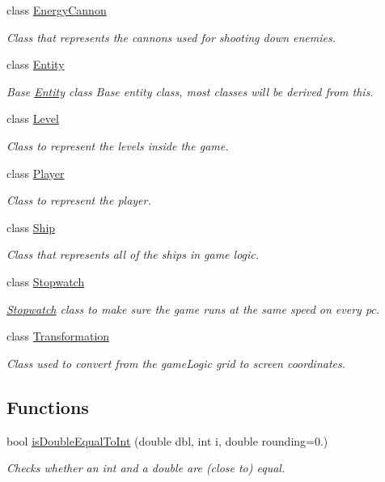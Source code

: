\begin{DoxyCompactItemize}
class \hyperlink{classGameLogic_1_1EnergyCannon}{Energy\+Cannon}
\begin{DoxyCompactList}\small\item\em Class that represents the cannons used for shooting down enemies. \end{DoxyCompactList}\item 
class \hyperlink{classGameLogic_1_1Entity}{Entity}
\begin{DoxyCompactList}\small\item\em Base \hyperlink{classGameLogic_1_1Entity}{Entity} class Base entity class, most classes will be derived from this. \end{DoxyCompactList}\item 
class \hyperlink{classGameLogic_1_1Level}{Level}
\begin{DoxyCompactList}\small\item\em Class to represent the levels inside the game. \end{DoxyCompactList}\item 
class \hyperlink{classGameLogic_1_1Player}{Player}
\begin{DoxyCompactList}\small\item\em Class to represent the player. \end{DoxyCompactList}\item 
class \hyperlink{classGameLogic_1_1Ship}{Ship}
\begin{DoxyCompactList}\small\item\em Class that represents all of the ships in game logic. \end{DoxyCompactList}\item 
class \hyperlink{classGameLogic_1_1Stopwatch}{Stopwatch}
\begin{DoxyCompactList}\small\item\em \hyperlink{classGameLogic_1_1Stopwatch}{Stopwatch} class to make sure the game runs at the same speed on every pc. \end{DoxyCompactList}\item 
class \hyperlink{classGameLogic_1_1Transformation}{Transformation}
\begin{DoxyCompactList}\small\item\em Class used to convert from the game\+Logic grid to screen coordinates. \end{DoxyCompactList}\end{DoxyCompactItemize}
\subsection*{Functions}
\begin{DoxyCompactItemize}
\item 
bool \hyperlink{namespaceGameLogic_a788b107597480e46241295de1c44670a}{is\+Double\+Equal\+To\+Int} (double dbl, int i, double rounding=0.)
\begin{DoxyCompactList}\small\item\em Checks whether an int and a double are (close to) equal. \end{DoxyCompactList}\end{DoxyCompactItemize}


